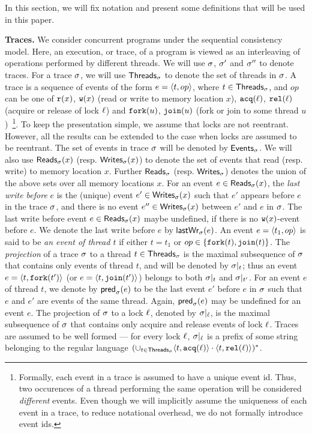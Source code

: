 In this section, we will fix notation and present some definitions
that will be used in this paper.

\vspace*{0.1in}
\noindent
{\bf Traces.}  We consider concurrent programs under the sequential
consistency model.  Here, an execution, or trace, of a program is
viewed as an interleaving of operations performed by different
threads.  We will use $\sigma$, $\sigma'$ and $\sigma''$ to denote traces.  For
a trace $\sigma$, we will use $\mathsf{Threads}_{\sigma}$ to denote the set of
threads in $\sigma$. A trace is a sequence of events of the form $e
= \langle t, op\rangle$, where $t \in \mathsf{Threads}_{\sigma}$, and $op$ can be one of
$\mathtt{r}(x)$, $\mathtt{w}(x)$ (read or write to memory location $x$),
$\mathtt{acq}(\ell)$, $\mathtt{rel}(\ell)$ (acquire or release of lock $\ell$) and
$\mathtt{fork}(u)$, $\mathtt{join}(u)$ (fork or join to some thread
$u$)~\footnote{Formally, each event in a trace is assumed to have a
unique event id. Thus, two occurences of a thread performing the same
operation will be considered \emph{different} events. Even though we
will implicitly assume the uniqueness of each event in a trace, to
reduce notational overhead, we do not formally introduce event ids.}.
To keep the presentation simple, we assume that locks are not
reentrant. However, all the results can be extended to the case when
locks are assumed to be reentrant. The set of events in trace $\sigma$
will be denoted by $\mathsf{Events}_{\sigma}$.  We will also use $\mathsf{Reads}_{\sigma}(x)$
(resp. $\mathsf{Writes}_{\sigma}(x)$) to denote the set of events that read
(resp. write) to memory location $x$.  Further $\mathsf{Reads}_{\sigma}$
(resp. $\mathsf{Writes}_{\sigma}$) denotes the union of the above sets over all
memory locations $x$. For an event $e \in \mathsf{Reads}_{\sigma}(x)$,
the \emph{last write before} $e$ is the (unique) event
$e' \in \mathsf{Writes}_{\sigma}(x)$ such that $e'$ appears before $e$ in the
trace $\sigma$, and there is no event $e'' \in \mathsf{Writes}_{\sigma}(x)$ between
$e'$ and $e$ in $\sigma$. The last write before event
$e \in \mathsf{Reads}_{\sigma}(x)$ maybe undefined, if there is no $\mathtt{w}(x)$-event
before $e$. We denote the last write before $e$ by $\mathsf{lastWr}_{\sigma}(e)$. An
event $e = \langle t_1, op\rangle$ is said to be \emph{an event of thread $t$}
if either $t = t_1$ or
$op \in \{\mathtt{fork}(t), \mathtt{join}(t)\}$. The \emph{projection} of a trace
$\sigma$ to a thread $t \in \mathsf{Threads}_{\sigma}$ is the maximal subsequence of
$\sigma$ that contains only events of thread $t$, and will be denoted by
$\sigma|_{t}$; thus an event $e = \langle t, \mathtt{fork}(t')\rangle$ (or $e
= \langle t, \mathtt{join}(t')\rangle$) belongs to both $\sigma|_{t}$ and
$\sigma|_{t'}$.  For an event $e$ of thread $t$, we denote by
$\mathsf{pred}_{\sigma}(e)$ to be the last event $e'$ before $e$ in $\sigma$ such
that $e$ and $e'$ are events of the same thread. Again,
$\mathsf{pred}_{\sigma}(e)$ may be undefined for an event $e$.  The projection of
$\sigma$ to a lock $\ell$, denoted by $\sigma|_{\ell}$, is the maximal
subsequence of $\sigma$ that contains only acquire and release events of
lock $\ell$.  Traces are assumed to be well formed --- for every lock
$\ell$, $\sigma|_{\ell}$ is a prefix of some string belonging to the
regular language
$(\cup_{t \in \mathsf{Threads}_{\sigma}} \langle t, \mathtt{acq}(\ell)\rangle \cdot \langle t, \mathtt{rel}(\ell)\rangle
)^*$.

